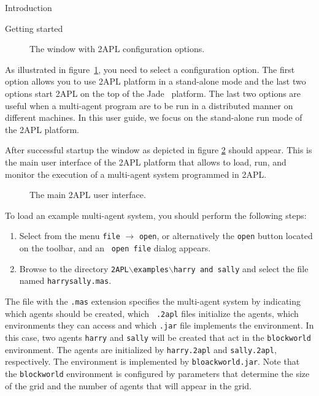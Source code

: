 \begin{chapter}{Introduction}
\begin{section}{Getting started}
    \begin{figure}
        \begin{center}
            \caption{The window with 2APL configuration options.}\label{fig:configuration}
        \end{center}
    \end{figure}

As illustrated in figure~\ref{fig:configuration}, you need to select
a configuration option. The first option allows you to use 2APL
platform in a stand-alone mode and the last two options start 2APL
on the top of the Jade~\cite{jade2005} platform. The last two
options are useful when a multi-agent program are to be run in a
distributed manner on different machines. In this user guide, we
focus on the stand-alone run mode of the 2APL platform.

After successful startup the window as depicted in figure
\ref{fig:mainscreen} should appear. This is the main user interface
of the 2APL platform that allows to load, run, and monitor the
execution of a multi-agent system programmed in 2APL.

    \begin{figure}
        \begin{center}
            \caption{The main 2APL user interface.}\label{fig:mainscreen}
        \end{center}
    \end{figure}

To load an example multi-agent system, you should perform the
following steps:
\begin{enumerate}
    \item Select from the menu {\tt file} $\rightarrow$ {\tt open}, or
    alternatively the {\tt open} button located on the toolbar, and an {\tt
    open file} dialog appears.
    \item Browse to the directory {\tt 2APL}$\backslash${\tt examples}$\backslash${\tt harry and sally} and
    select the file named {\tt harrysally.mas}.
\end{enumerate}

The file with the {\tt .mas} extension specifies the multi-agent
system by indicating which agents should be created, which {\tt
.2apl} files initialize the agents, which environments they can
access and which {\tt .jar} file implements the environment. In this
case, two agents {\tt harry} and {\tt sally} will be created that
act in the {\tt blockworld} environment. The agents are initialized
by {\tt harry.2apl} and {\tt sally.2apl}, respectively. The
environment is implemented by {\tt bloackworld.jar}. Note that the
{\tt blockworld} environment is configured by parameters that
determine the size of the grid and the number of agents that will
appear in the grid.


\end{section}
\end{chapter}
